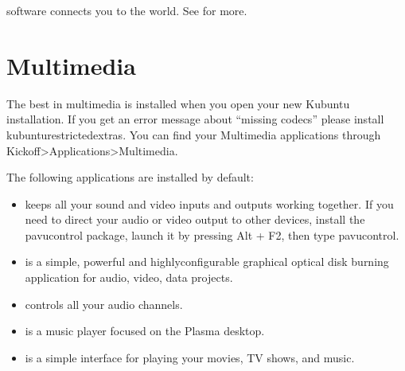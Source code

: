 \documentclass[letterpaper,10pt,english]{sphinxmanual}
\begin{document}
\sphinxAtStartPar
{} software connects you to the world. See  for more.


\section{Multimedia}
\label{\detokenize{docs/software:multimedia}}
\sphinxAtStartPar
The best in multimedia is installed when you open your new Kubuntu installation. If you get an error message about “missing codecs” please install kubuntu\sphinxhyphen{}restricted\sphinxhyphen{}extras. You can find your Multimedia applications through Kickoff\sphinxhyphen{}\textgreater{}Applications\sphinxhyphen{}\textgreater{}Multimedia.

\sphinxAtStartPar
The following applications are installed by default:
\begin{itemize}
\item {} 
\sphinxAtStartPar
{} keeps all your sound and video inputs and outputs working together. If you need to direct your audio or video output to other devices, install the pavucontrol package, launch it by pressing Alt + F2, then type pavucontrol.

\item {} 
\sphinxAtStartPar
{} is a simple, powerful and highly\sphinxhyphen{}configurable graphical optical disk burning application for audio, video, data projects.

\item {} 
\sphinxAtStartPar
{} controls all your audio channels.

\item {} 
\sphinxAtStartPar
{} is a music player focused on the Plasma desktop.

\item {} 
\sphinxAtStartPar
{} is a simple interface for playing your movies, TV shows, and music.

\end{itemize}
\end{document}
